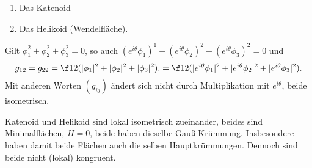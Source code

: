 \begin{ex}
	\begin{enumerate}[1.]
		\item
			Das Katenoid
		\item
			Das Helikoid (Wendelfläche).
	\end{enumerate}
	Gilt $\phi_1^2 + \phi_2^2 + \phi_3^2 = 0$, so auch $(e^{i\theta} \phi_1)^1 + (e^{i\theta} \phi_2)^2 + (e^{i\theta} \phi_3)^2 = 0$ und
	\[
		g_{12}
		= g_{22}
		= \f 12 (|\phi_1|^2 + |\phi_2|^2 + |\phi_3|^2).
		= \f 12 (|e^{i\theta}\phi_1|^2 + |e^{i\theta} \phi_2|^2 + |e^{i\theta} \phi_3|^2).
	\]
	Mit anderen Worten $(g_{ij})$ ändert sich nicht durch Multiplikation mit $e^{i\theta}$, beide isometrisch.

	Katenoid und Helikoid sind lokal isometrisch zueinander, beides sind Minimalflächen, $H = 0$, beide haben dieselbe Gauß-Krümmung.
	Insbesondere haben damit beide Flächen auch die selben Hauptkrümmungen.
	Dennoch sind beide nicht (lokal) kongruent.
\end{ex}

